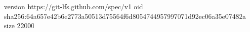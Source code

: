 version https://git-lfs.github.com/spec/v1
oid sha256:64a657e42b6e2773a50513d75564f6d8054744957997071d92ec06a35e07482a
size 22000
